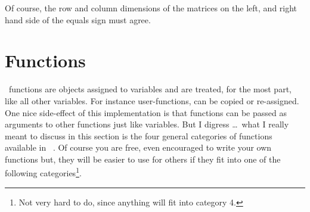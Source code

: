    Of course, the row and column dimensions of the matrices on the
   left, and right hand side of the equals sign must agree.

\section{Functions}
\label{sec:functions}

   \RLaB\ functions are objects assigned to variables and are
   treated, for the most part, like all other variables. For instance
   user-functions, can be copied or re-assigned. One nice side-effect
   of this implementation is that functions can be passed as arguments
   to other functions just like variables. But I digress \ldots\ what
   I really meant to discuss in this section is the four general
   categories of functions available in \RLaB\ . Of course you are
   free, even encouraged to write your own functions but, they will be
   easier to use for others if they fit into one of the following
   categories\footnote{Not very hard to do, since anything will fit
   into category 4.}.

